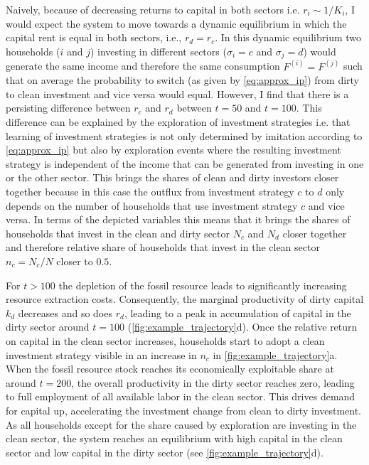 Naively, because of decreasing returns to capital in both sectors i.e. $r_i \sim 1/K_i$, I would expect the system to move towards a dynamic equilibrium in which the capital rent is equal in both sectors, i.e., $r_d = r_c$. In this dynamic equilibrium two households
($i$ and $j$) investing in different sectors ($\sigma_i=c$ and $\sigma_j=d$) would generate the same income and therefore the same consumption $F^{(i)}=F^{(j)}$ such that on average the probability to switch (as given by \cref{eq:approx_ip}) from dirty to clean investment and vice versa would equal. However, I find that there is a persisting difference between $r_c$ and $r_d$ between $t=50$ and $t=100$.
This difference can be explained by the exploration of investment strategies i.e. that learning of investment strategies is not only determined by imitation according to \cref{eq:approx_ip} but also by exploration events where the resulting investment strategy is independent of the income that can be generated from investing in one or the other sector. This brings the shares of clean and dirty investors closer together because in this case the outflux from investment strategy $c$ to $d$ only depends on the number of households that use investment strategy $c$ and vice versa. In terms of the depicted variables this means that it brings the shares of households that invest in the clean and dirty sector $N_c$ and $N_d$ closer together and therefore relative share of households that invest in the clean sector $n_c=N_c/N$ closer to $0.5$. 

For $t>100$ the depletion of the fossil resource leads to significantly increasing resource extraction costs. Consequently, the marginal productivity of dirty capital $k_d$ decreases and so does $r_d$, leading to a peak in accumulation of capital in the dirty sector around $t=100$ (\cref{fig:example_trajectory}d).
Once the relative return on capital in the clean sector increases, households start to adopt a clean investment strategy visible in an increase in $n_c$ in \cref{fig:example_trajectory}a.
When the fossil resource stock reaches its economically exploitable share at around $t=200$, the overall productivity in the dirty sector reaches zero, leading to full employment of all available labor in the clean sector.
This drives demand for capital up, accelerating the investment change from clean to dirty investment.
As all households except for the share caused by exploration are investing in the clean sector, the system reaches an equilibrium with high capital in the clean sector and low capital in the dirty sector (see \cref{fig:example_trajectory}d).

